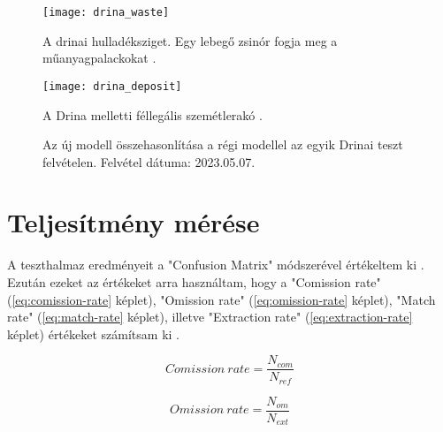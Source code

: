 \begin{figure}[H]
	\centering
	\texttt{[image: drina\_waste]}
	\caption{A drinai hulladéksziget. Egy lebegő zsinór fogja meg a műanyagpalackokat \cite{euronews2024}.}
    \label{fig:drina-floating-waste}
\end{figure}

\begin{figure}[H]
	\centering
	\texttt{[image: drina\_deposit]}
	\caption{A Drina melletti féllegális szemétlerakó \cite{petkupa2024}.}
    \label{fig:drina-deposit}
\end{figure}

\begin{figure}[H]
	\centering
	\hspace{5pt}
	\hspace{5pt}
	\caption{Az új modell összehasonlítása a régi modellel az egyik Drinai teszt felvételen. Felvétel dátuma: 2023.05.07.}
	\label{fig:old-vs-new}
\end{figure}

\section{Teljesítmény mérése}

A teszthalmaz eredményeit a "Confusion Matrix" módszerével értékeltem ki \cite{CONGALTON199135}. Ezután ezeket az értékeket arra használtam, hogy a "Comission rate" (\ref{eq:comission-rate} képlet), "Omission rate" (\ref{eq:omission-rate} képlet), "Match rate" (\ref{eq:match-rate} képlet), illetve "Extraction rate" (\ref{eq:extraction-rate} képlet) értékeket számítsam ki \cite{Fekete2021}.

\begin{equation}\label{eq:comission-rate}
    Comission \ rate = \frac{N_{com}}{N_{ref}}
\end{equation}

\begin{equation}\label{eq:omission-rate}
    Omission \ rate = \frac{N_{om}}{N_{ext}}
\end{equation}

